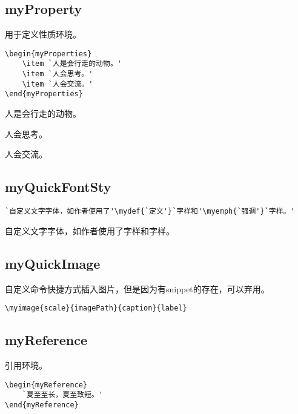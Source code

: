 \documentclass{ctexart}
\begin{document}
    \subsection{myProperty}
    
    用于定义性质环境。

    
    \begin{lstlisting}
\begin{myProperties}
    \item `人是会行走的动物。'
    \item `人会思考。'
    \item `人会交流。'
\end{myProperties}
    \end{lstlisting}
    
    
    \begin{myProperties}
        \item 人是会行走的动物。
        \item 人会思考。
        \item 人会交流。
    \end{myProperties}
    
    \subsection{myQuickFontSty}
    
    \begin{lstlisting}
`自定义文字字体，如作者使用了'\mydef{`定义'}`字样和'\myemph{`强调'}`字样。'
    \end{lstlisting}
    
    自定义文字字体，如作者使用了字样和字样。

    \subsection{myQuickImage}
    自定义命令快捷方式插入图片，但是因为有snippet的存在，可以弃用。
    \begin{lstlisting}
\myimage{scale}{imagePath}{caption}{label}
    \end{lstlisting}
    
    \subsection{myReference}
    引用环境。
    
    \begin{lstlisting}
\begin{myReference}
    `夏至至长，夏至致短。'
\end{myReference}
    \end{lstlisting}
    
\end{document}
